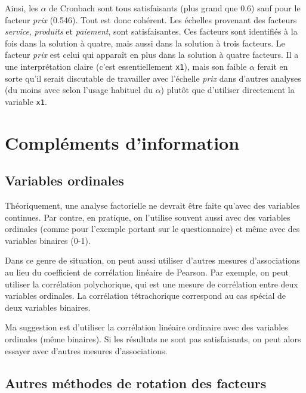 \documentclass[
  11pt,
  letterpaper,
]{scrbook}
\theoremstyle{definition}
\theoremstyle{remark}
\begin{document}
Ainsi, les \(\alpha\) de Cronbach sont tous satisfaisants (plus grand
que 0.6) sauf pour le facteur \emph{prix} (0.546). Tout est donc
cohérent. Les échelles provenant des facteurs \emph{service},
\emph{produits} et \emph{paiement}, sont satisfaisantes. Ces facteurs
sont identifiés à la fois dans la solution à quatre, mais aussi dans la
solution à trois facteurs. Le facteur \emph{prix} est celui qui apparaît
en plus dans la solution à quatre facteurs. Il a une interprétation
claire (c'est essentiellement \texttt{x1}), mais son faible \(\alpha\)
ferait en sorte qu'il serait discutable de travailler avec l'échelle
\emph{prix} dans d'autres analyses (du moins avec selon l'usage habituel
du \(\alpha\)) plutôt que d'utiliser directement la variable
\texttt{x1}.

\hypertarget{compluxe9ments-dinformation}{%
\section{Compléments d'information}\label{compluxe9ments-dinformation}}

\hypertarget{variables-ordinales}{%
\subsection{Variables ordinales}\label{variables-ordinales}}

Théoriquement, une analyse factorielle ne devrait être faite qu'avec des
variables continues. Par contre, en pratique, on l'utilise souvent aussi
avec des variables ordinales (comme pour l'exemple portant sur le
questionnaire) et même avec des variables binaires (0-1).

Dans ce genre de situation, on peut aussi utiliser d'autres mesures
d'associations au lieu du coefficient de corrélation linéaire de
Pearson. Par exemple, on peut utiliser la corrélation polychorique, qui
est une mesure de corrélation entre deux variables ordinales. La
corrélation tétrachorique correspond au cas spécial de deux variables
binaires.

Ma suggestion est d'utiliser la corrélation linéaire ordinaire avec des
variables ordinales (même binaires). Si les résultats ne sont pas
satisfaisants, on peut alors essayer avec d'autres mesures
d'associations.

\hypertarget{autres-muxe9thodes-de-rotation-des-facteurs}{%
\subsection{Autres méthodes de rotation des
facteurs}\label{autres-muxe9thodes-de-rotation-des-facteurs}}
\end{document}
